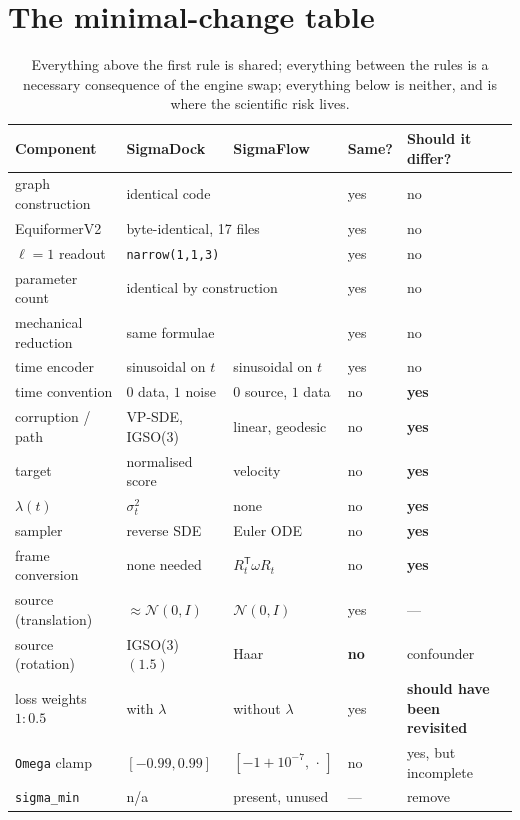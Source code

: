 \documentclass[11pt,a4paper]{report}
\theoremstyle{definition}
\theoremstyle{remark}
\newcommand{\pyfunc}[1]{\texttt{#1}}
\begin{document}
\section{The minimal-change table}
\label{sec:engine-diff-table}

\begin{table}[htbp]
\centering
\small
\begin{tabular}{lllll}
\toprule
Component & SigmaDock & SigmaFlow & Same? & Should it differ? \\
\midrule
graph construction & \multicolumn{2}{l}{identical code} & yes & no \\
EquiformerV2 & \multicolumn{2}{l}{byte-identical, 17 files} & yes & no \\
$\ell=1$ readout & \multicolumn{2}{l}{\texttt{narrow(1,1,3)}} & yes & no \\
parameter count & \multicolumn{2}{l}{identical by construction} & yes & no \\
mechanical reduction & \multicolumn{2}{l}{same formulae} & yes & no \\
time encoder & sinusoidal on $t$ & sinusoidal on $t$ & yes & no \\
\midrule
time convention & $0$ data, $1$ noise & $0$ source, $1$ data & no & \textbf{yes} \\
corruption / path & VP-SDE, IGSO(3) & linear, geodesic & no & \textbf{yes} \\
target & normalised score & velocity & no & \textbf{yes} \\
$\lambda(t)$ & $\sigma_t^2$ & none & no & \textbf{yes} \\
sampler & reverse SDE & Euler ODE & no & \textbf{yes} \\
frame conversion & none needed & $R_t^{\mathsf T}\omega R_t$ & no & \textbf{yes} \\
\midrule
source (translation) & $\approx\mathcal N(0,I)$ & $\mathcal N(0,I)$ & yes & --- \\
source (rotation) & IGSO(3)$(1.5)$ & Haar & \textbf{no} & confounder \\
loss weights $1{:}0.5$ & with $\lambda$ & without $\lambda$ & yes & \textbf{should have been revisited} \\
\pyfunc{Omega} clamp & $[-0.99,0.99]$ & $[-1{+}10^{-7},\,\cdot\,]$ & no & yes, but incomplete \\
\texttt{sigma\_min} & n/a & present, unused & --- & remove \\
\bottomrule
\end{tabular}
\caption{Everything above the first rule is shared; everything between the
rules is a necessary consequence of the engine swap; everything below is
neither, and is where the scientific risk lives.}
\label{tab:minimal-change}
\end{table}
\end{document}
